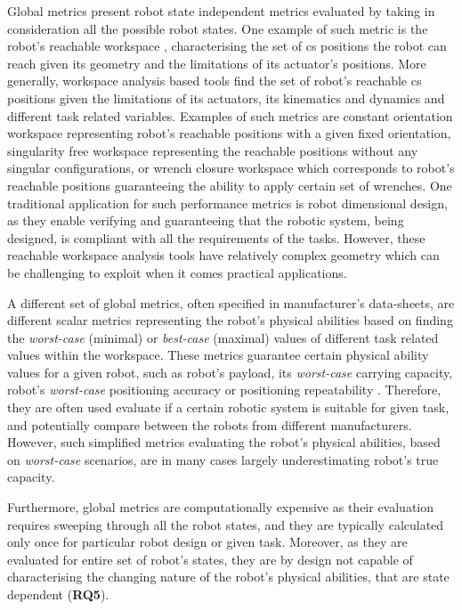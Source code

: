 Global metrics present robot state independent metrics evaluated by taking in consideration all the possible robot states.
One example of such metric is the robot's reachable workspace \cite{Gosselin1991Synthesis,Vahrenkamp2016,kucuk2005robot}, characterising the set of \gls{cs} positions the robot can reach given its geometry and the limitations of its actuator's positions. More generally, workspace analysis based tools find the set of robot's reachable \gls{cs} positions given the limitations of its actuators, its kinematics and dynamics and different task related variables. Examples of such metrics are  constant orientation workspace \cite{Merlet1999Determination} representing robot's reachable positions with a given fixed orientation, singularity free workspace \cite{Jiang2008} representing the reachable positions without any singular configurations, or wrench closure workspace \cite{gouttefarde2006determination,Lau2011} which corresponds to robot's reachable positions guaranteeing the ability to apply certain set of wrenches.
One traditional application for such performance metrics is robot dimensional design, as they enable verifying and guaranteeing that the robotic system, being designed, is compliant with all the requirements of the tasks. 
However, these reachable workspace analysis tools have relatively complex geometry which can be challenging to exploit when it comes practical applications. 

A different set of global metrics, often specified in manufacturer's data-sheets, are different scalar metrics representing the robot's physical abilities based on finding the \textit{worst-case} (minimal) or \textit{best-case} (maximal) values of different task related values within the workspace. These metrics guarantee certain physical ability values for a given robot, such as robot's payload, its \textit{worst-case} carrying capacity, robot's \textit{worst-case} positioning accuracy or positioning repeatability \cite{russo2022measuring}. 
Therefore, they are often used evaluate if a certain robotic system is suitable for given task, and potentially compare between the robots from different manufacturers. However, such simplified metrics evaluating the robot's physical abilities, based on \textit{worst-case} scenarios, are in many cases largely underestimating robot's true capacity.

Furthermore, global metrics are computationally expensive as their evaluation requires sweeping through all the robot states, and they are typically calculated only once for particular robot design or given task. Moreover, as they are evaluated for entire set of robot's states, they are by design not capable of characterising the changing nature of the robot's physical abilities, that are state dependent (\textbf{RQ5}).

